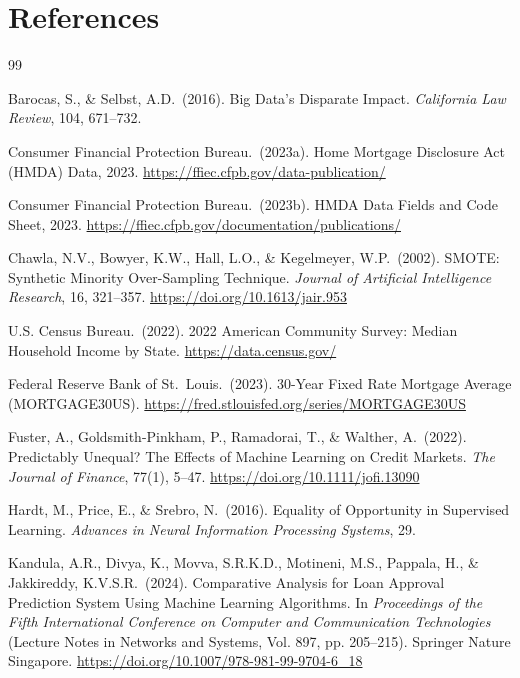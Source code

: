 \documentclass[12pt,letterpaper]{article}
\begin{document}
\section*{References}
\begin{thebibliography}{99}

Barocas, S., \& Selbst, A.D.\ (2016).
Big Data's Disparate Impact.
\textit{California Law Review}, 104, 671--732.

Consumer Financial Protection Bureau.\ (2023a).
Home Mortgage Disclosure Act (HMDA) Data, 2023.
\url{https://ffiec.cfpb.gov/data-publication/}

Consumer Financial Protection Bureau.\ (2023b).
HMDA Data Fields and Code Sheet, 2023.
\url{https://ffiec.cfpb.gov/documentation/publications/}

Chawla, N.V., Bowyer, K.W., Hall, L.O., \& Kegelmeyer, W.P.\ (2002).
SMOTE: Synthetic Minority Over-Sampling Technique.
\textit{Journal of Artificial Intelligence Research}, 16, 321--357.
\url{https://doi.org/10.1613/jair.953}

U.S. Census Bureau.\ (2022).
2022 American Community Survey: Median Household Income by State.
\url{https://data.census.gov/}

Federal Reserve Bank of St.\ Louis.\ (2023).
30-Year Fixed Rate Mortgage Average (MORTGAGE30US).
\url{https://fred.stlouisfed.org/series/MORTGAGE30US}

Fuster, A., Goldsmith-Pinkham, P., Ramadorai, T., \& Walther, A.\ (2022).
Predictably Unequal? The Effects of Machine Learning on Credit Markets.
\textit{The Journal of Finance}, 77(1), 5--47.
\url{https://doi.org/10.1111/jofi.13090}

Hardt, M., Price, E., \& Srebro, N.\ (2016).
Equality of Opportunity in Supervised Learning.
\textit{Advances in Neural Information Processing Systems}, 29.

Kandula, A.R., Divya, K., Movva, S.R.K.D., Motineni, M.S., Pappala, H., \& Jakkireddy, K.V.S.R.\ (2024).
Comparative Analysis for Loan Approval Prediction System Using Machine Learning Algorithms.
In \textit{Proceedings of the Fifth International Conference on Computer and Communication Technologies} (Lecture Notes in Networks and Systems, Vol. 897, pp. 205--215).
Springer Nature Singapore.
\url{https://doi.org/10.1007/978-981-99-9704-6_18}


\end{thebibliography}
\end{document}

